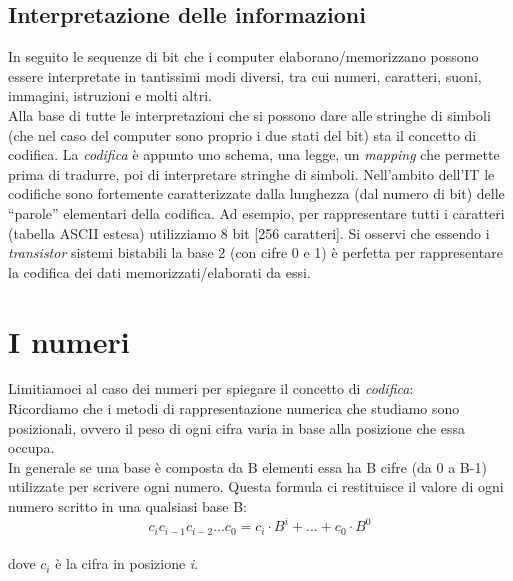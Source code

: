 \documentclass[class=book, crop=false, oneside]{standalone}
\begin{document}
\subsection{Interpretazione delle informazioni} In seguito le sequenze di bit che i computer elaborano/memorizzano possono essere interpretate in tantissimi modi diversi, tra cui numeri, caratteri, suoni, immagini, istruzioni e molti altri.\\
Alla base di tutte le interpretazioni che si possono dare alle stringhe di simboli (che nel caso del computer sono proprio i due stati del bit) sta il concetto di codifica. La \emph{codifica} è appunto uno schema, una legge, un \emph{mapping} che permette prima di tradurre, poi di interpretare stringhe di simboli.
Nell’ambito dell’IT le codifiche sono fortemente caratterizzate dalla lunghezza (dal numero di bit) delle “parole” elementari della codifica. Ad esempio, per rappresentare tutti i caratteri (tabella ASCII estesa) utilizziamo  8 bit [256 caratteri].
Si osservi che essendo i \emph{transistor} sistemi bistabili la base 2 (con cifre 0 e 1) è perfetta per rappresentare la codifica dei dati memorizzati/elaborati da essi.
\section{I numeri}
Limitiamoci al caso dei numeri per spiegare il concetto di \emph{codifica}:\\
Ricordiamo che i  metodi di rappresentazione numerica che studiamo sono posizionali, ovvero il peso di ogni cifra varia in base alla posizione che essa  occupa.\\
In generale se una base è composta da B elementi essa ha B cifre (da 0 a B-1) utilizzate per scrivere ogni numero.
Questa formula ci restituisce il valore di ogni numero scritto in una qualsiasi base B:\\
\[c_{i} c_{i-1} c_{i-2}... c_{0}=c_{i}\cdot B^{i}+...+c_{0}\cdot B^{0}\]\\
dove $c_{i}$ è la cifra in posizione \emph{i}.
\end{document}
